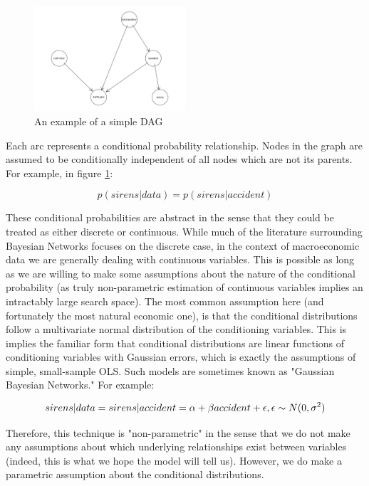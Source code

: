 \documentclass{article}
\begin{document}
\begin{figure}
\centering
\label{dag1}
\includegraphics[width=0.5\textwidth]{images/trafficjam.png}
\caption{An example of a simple DAG \cite{traffic_jam}}
\end{figure}

Each arc represents a conditional probability relationship. Nodes in the graph are assumed to be conditionally independent of all nodes which are not its parents. For example, in figure \ref{dag1}: 

\begin{equation}
    \label{eq1}
    p(sirens | data) = p(sirens | accident)
\end{equation}

These conditional probabilities are abstract in the sense that they could be treated as either discrete or continuous. While much of the literature surrounding Bayesian Networks focuses on the discrete case, in the context of macroeconomic data we are generally dealing with continuous variables. This is possible as long as we are willing to make some assumptions about the nature of the conditional probability (as truly non-parametric estimation of continuous variables implies an intractably large search space). The most common assumption here (and fortunately the most natural economic one), is that the conditional distributions follow a multivariate normal distribution of the conditioning variables. This is implies the familiar form that conditional distributions are linear functions of conditioning variables with Gaussian errors, which is exactly the assumptions of simple, small-sample OLS. Such models are sometimes known as "Gaussian Bayesian Networks." For example:

\begin{equation}
    \label{eq2}
    sirens|data = sirens|accident = \alpha + \beta accident + \epsilon, \space \epsilon \sim N(0, \sigma^2)
\end{equation}

Therefore, this technique is "non-parametric" in the sense that we do not make any assumptions about which underlying relationships exist between variables (indeed, this is what we hope the model will tell us). However, we do make a parametric assumption about the conditional distributions.
\end{document}
